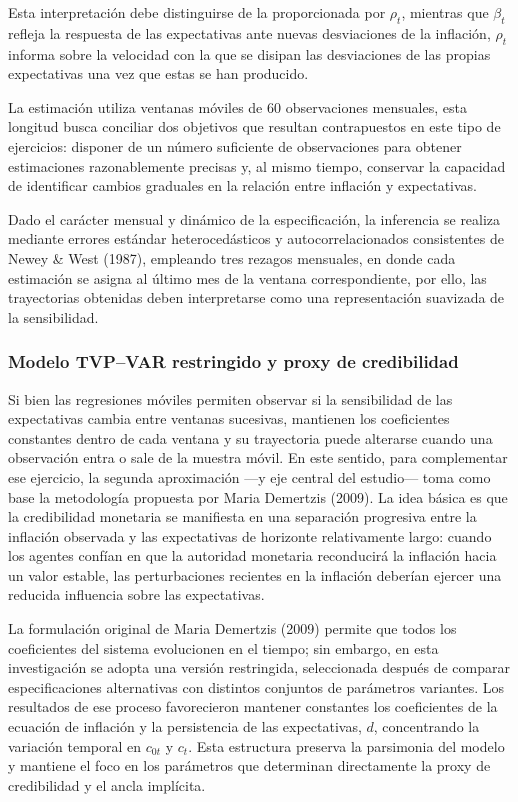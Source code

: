 \documentclass[
  10.5pt,
  letterpaper,
  twocolumn]{article}
\begin{document}
Esta interpretación debe distinguirse de la proporcionada por
\(\rho_t\), mientras que \(\beta_t\) refleja la respuesta de las
expectativas ante nuevas desviaciones de la inflación, \(\rho_t\)
informa sobre la velocidad con la que se disipan las desviaciones de las
propias expectativas una vez que estas se han producido.

La estimación utiliza ventanas móviles de 60 observaciones mensuales,
esta longitud busca conciliar dos objetivos que resultan contrapuestos
en este tipo de ejercicios: disponer de un número suficiente de
observaciones para obtener estimaciones razonablemente precisas y, al
mismo tiempo, conservar la capacidad de identificar cambios graduales en
la relación entre inflación y expectativas.

Dado el carácter mensual y dinámico de la especificación, la inferencia
se realiza mediante errores estándar heterocedásticos y
autocorrelacionados consistentes de Newey \& West (1987), empleando tres
rezagos mensuales, en donde cada estimación se asigna al último mes de
la ventana correspondiente, por ello, las trayectorias obtenidas deben
interpretarse como una representación suavizada de la sensibilidad.

\subsubsection{Modelo TVP--VAR restringido y proxy de
credibilidad}\label{modelo-tvpvar-restringido-y-proxy-de-credibilidad}

Si bien las regresiones móviles permiten observar si la sensibilidad de
las expectativas cambia entre ventanas sucesivas, mantienen los
coeficientes constantes dentro de cada ventana y su trayectoria puede
alterarse cuando una observación entra o sale de la muestra móvil. En
este sentido, para complementar ese ejercicio, la segunda aproximación
---y eje central del estudio--- toma como base la metodología propuesta
por Maria Demertzis (2009). La idea básica es que la credibilidad
monetaria se manifiesta en una separación progresiva entre la inflación
observada y las expectativas de horizonte relativamente largo: cuando
los agentes confían en que la autoridad monetaria reconducirá la
inflación hacia un valor estable, las perturbaciones recientes en la
inflación deberían ejercer una reducida influencia sobre las
expectativas.

La formulación original de Maria Demertzis (2009) permite que todos los
coeficientes del sistema evolucionen en el tiempo; sin embargo, en esta
investigación se adopta una versión restringida, seleccionada después de
comparar especificaciones alternativas con distintos conjuntos de
parámetros variantes. Los resultados de ese proceso favorecieron
mantener constantes los coeficientes de la ecuación de inflación y la
persistencia de las expectativas, \(d\), concentrando la variación
temporal en \(c_{0t}\) y \(c_t\). Esta estructura preserva la parsimonia
del modelo y mantiene el foco en los parámetros que determinan
directamente la proxy de credibilidad y el ancla implícita.
\end{document}
